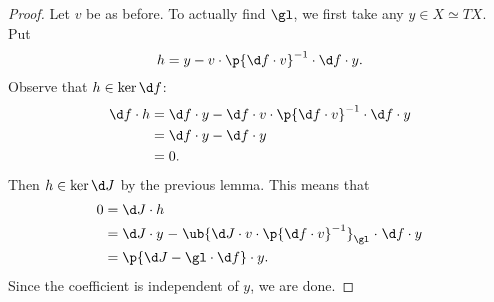 \begin{proof}
  Let $v$ be as before.
  To actually find $\gl$, we first take any $y \in X \simeq TX$.
  Put
  $$ h = y - v \cdot \p{ \d f \cdot v }^{-1} \cdot \d f \cdot y. $$
  Observe that $h \in \ker \d f$:
  \begin{align*}
    \d f \cdot h
    &= \d f \cdot y - \d f \cdot v \cdot \p{ \d f \cdot v }^{-1} \cdot \d f \cdot y \\
    &= \d f \cdot y - \d f \cdot y \\
    &= 0.
  \end{align*}
  Then $h \in \ker \d J$ by the previous lemma.
  This means that
  \begin{align*}
    0
    &= \d J \cdot h \\
    &= \d J \cdot y \mathrel{-} \ub{\d J \cdot v \cdot \p{\d f \cdot v}^{-1}}_{\gl} \mathrel{\cdot} \d f \cdot y \\
    &= \p{ \d J - \gl \cdot \d f  } \cdot y.
  \end{align*}
  Since the coefficient is independent of $y$, we are done.
\end{proof}